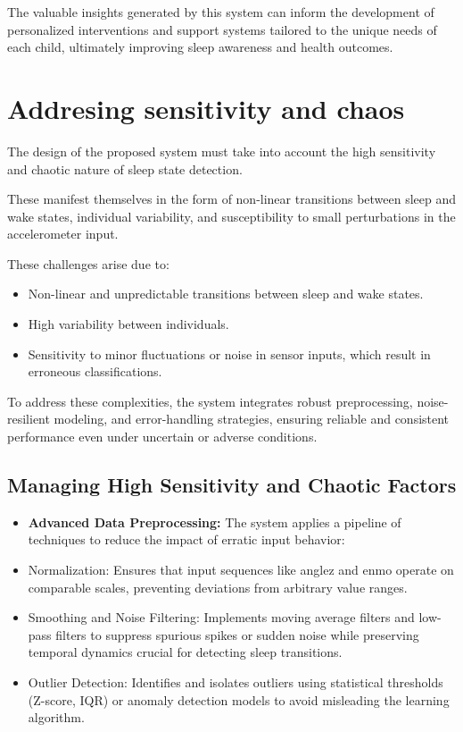 \documentclass[conference]{IEEEtran}
\begin{document}
The valuable insights generated by this system can inform the development of personalized interventions and support systems tailored to the unique needs of each child, ultimately improving sleep awareness and health outcomes.


\section{Addresing sensitivity and chaos}

The design of the proposed system must take into account the high sensitivity and chaotic nature of sleep state detection.

These manifest themselves in the form of non-linear transitions between sleep and wake states, individual variability, and susceptibility to small perturbations in the accelerometer input.

These challenges arise due to:
\begin{itemize}
\item Non-linear and unpredictable transitions between sleep and wake states.
\item High variability between individuals.
\item Sensitivity to minor fluctuations or noise in sensor inputs, which result in erroneous classifications.
\end{itemize}

To address these complexities, the system integrates robust preprocessing, noise-resilient modeling, and error-handling strategies, ensuring reliable and consistent performance even under uncertain or adverse conditions.

\subsection{Managing High Sensitivity and Chaotic Factors}

\begin{itemize}

\item \textbf{Advanced Data Preprocessing:}
The system applies a pipeline of techniques to reduce the impact of erratic input behavior:
\item Normalization: Ensures that input sequences like anglez and enmo operate on comparable scales, preventing deviations from arbitrary value ranges.
\item Smoothing and Noise Filtering: Implements moving average filters and low-pass filters to suppress spurious spikes or sudden noise while preserving temporal dynamics crucial for detecting sleep transitions.
\item Outlier Detection: Identifies and isolates outliers using statistical thresholds (Z-score, IQR) or anomaly detection models to avoid misleading the learning algorithm.

\end{itemize}
\end{document}
